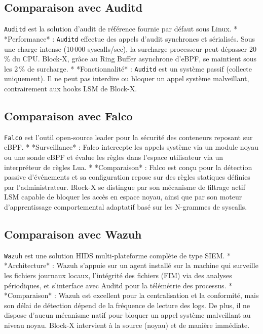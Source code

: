 \documentclass[11pt,a4paper]{article}
\begin{document}
\subsection{Comparaison avec Auditd}
\texttt{Auditd} est la solution d'audit de référence fournie par défaut sous Linux.
*   *Performance* : \texttt{Auditd} effectue des appels d'audit synchrones et sérialisés. Sous une charge intense (10\,000 syscalls/sec), la surcharge processeur peut dépasser 20\,\% du CPU. Block-X, grâce au Ring Buffer asynchrone d'eBPF, se maintient sous les 2\,\% de surcharge.
*   *Fonctionnalité* : \texttt{Auditd} est un système passif (collecte uniquement). Il ne peut pas interdire ou bloquer un appel système malveillant, contrairement aux hooks LSM de Block-X.

\subsection{Comparaison avec Falco}
\texttt{Falco} est l'outil open-source leader pour la sécurité des conteneurs reposant sur eBPF.
*   *Surveillance* : Falco intercepte les appels système via un module noyau ou une sonde eBPF et évalue les règles dans l'espace utilisateur via un interpréteur de règles Lua.
*   *Comparaison* : Falco est conçu pour la détection passive d'événements et sa configuration repose sur des règles statiques définies par l'administrateur. Block-X se distingue par son mécanisme de filtrage actif LSM capable de bloquer les accès en espace noyau, ainsi que par son moteur d'apprentissage comportemental adaptatif basé sur les N-grammes de syscalls.

\subsection{Comparaison avec Wazuh}
\texttt{Wazuh} est une solution HIDS multi-plateforme complète de type SIEM.
*   *Architecture* : Wazuh s'appuie sur un agent installé sur la machine qui surveille les fichiers journaux locaux, l'intégrité des fichiers (FIM) via des analyses périodiques, et s'interface avec Auditd pour la télémétrie des processus.
*   *Comparaison* : Wazuh est excellent pour la centralisation et la conformité, mais son délai de détection dépend de la fréquence de lecture des logs. De plus, il ne dispose d'aucun mécanisme natif pour bloquer un appel système malveillant au niveau noyau. Block-X intervient à la source (noyau) et de manière immédiate.
\end{document}
